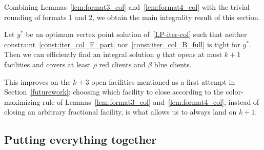 Combining Lemmas~\ref{lem:format3_col} and~\ref{lem:format4_col} with the trivial rounding of formats 1 and 2, we obtain the main integrality result of this section.

\begin{theorem} \label{thm:colorful_main}
Let $y^*$ be an optimum vertex point solution of~\eqref{LP-iter-col} such that neither constraint~\eqref{const:iter_col_F_part} nor~\eqref{const:iter_col_B_full} is tight for $y^*$. Then we can efficiently find an integral solution $y$ that opens at most $k+1$ facilities and covers at least $\rho$ red clients and $\beta$ blue clients.
\end{theorem}

This improves on the $k+3$ open facilities mentioned as a first attempt in Section~\ref{futurework}: choosing which facility to close according to the color-maximizing rule of Lemmas~\ref{lem:format3_col} and~\ref{lem:format4_col}, instead of closing an arbitrary fractional facility, is what allows us to always land on $k+1$.


\subsection{Putting everything together}

